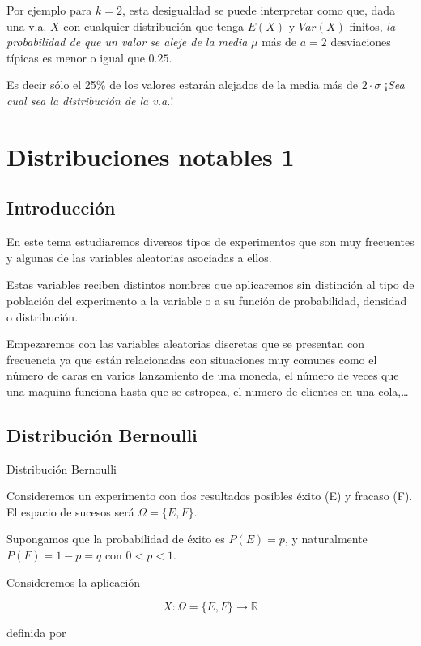 \documentclass[
  letterpaper,
  DIV=11,
  numbers=noendperiod]{scrreprt}
\begin{document}
Por ejemplo para \(k=2\), esta desigualdad se puede interpretar como
que, dada una v.a. \(X\) con cualquier distribución que tenga \(E(X)\) y
\(Var(X)\) finitos, \emph{la probabilidad de que un valor se aleje de la
media} \(\mu\) más de \(a=2\) desviaciones típicas es menor o igual que
\(0.25\).

Es decir sólo el 25\% de los valores estarán alejados de la media más de
\(2\cdot \sigma\) ¡\emph{Sea cual sea la distribución de la v.a.}!

\chapter{Distribuciones notables 1}\label{distribuciones-notables-1}

\section{Introducción}\label{introducciuxf3n-1}

En este tema estudiaremos diversos tipos de experimentos que son muy
frecuentes y algunas de las variables aleatorias asociadas a ellos.

Estas variables reciben distintos nombres que aplicaremos sin distinción
al tipo de población del experimento a la variable o a su función de
probabilidad, densidad o distribución.

Empezaremos con las variables aleatorias discretas que se presentan con
frecuencia ya que están relacionadas con situaciones muy comunes como el
número de caras en varios lanzamiento de una moneda, el número de veces
que una maquina funciona hasta que se estropea, el numero de clientes en
una cola,\ldots{}

\section{Distribución Bernoulli}\label{distribuciuxf3n-bernoulli}

Distribución Bernoulli

Consideremos un experimento con dos resultados posibles éxito (E) y
fracaso (F). El espacio de sucesos será \(\Omega=\{E,F\}\).

Supongamos que la probabilidad de éxito es \(P(E)=p\), y naturalmente
\(P(F)=1-p=q\) con \(0<p<1\).

Consideremos la aplicación

\[
X:\Omega=\{E,F\}\to \mathbb{R}
\]

definida por
\end{document}
